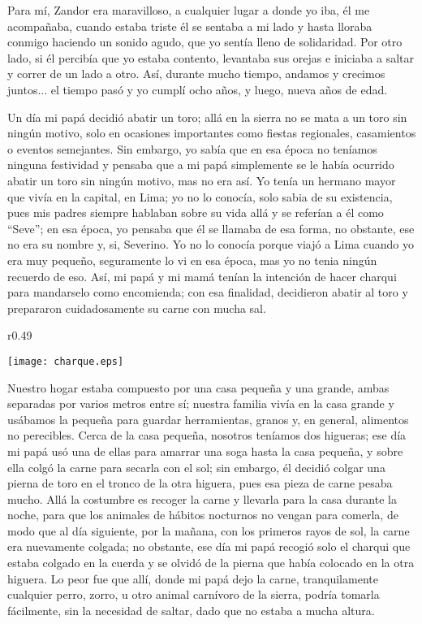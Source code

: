 Para mí, Zandor era maravilloso, a cualquier lugar a donde yo iba, él me acompañaba, cuando estaba triste él se sentaba a mi lado y hasta lloraba conmigo haciendo un sonido agudo, que yo sentía lleno de solidaridad.
Por otro lado, si él percibía que yo estaba contento, levantaba sus orejas e iniciaba a saltar y correr de un lado a otro. Así, durante mucho tiempo, andamos y crecimos juntos... el tiempo pasó y yo cumplí ocho años, y luego, nueva años de edad.

Un día mi papá decidió abatir un toro; allá en la sierra no se mata a un toro sin ningún motivo, solo en ocasiones importantes como fiestas regionales, casamientos o eventos semejantes. Sin embargo, yo sabía que en esa época no teníamos ninguna festividad y pensaba que a mi papá simplemente se le había ocurrido abatir un toro sin ningún motivo, mas no era así.
Yo tenía un hermano mayor que vivía en la capital, en Lima; yo no lo conocía, solo sabia de su existencia, pues mis padres siempre hablaban sobre su vida allá y se referían a él como ``Seve''; en esa época, yo pensaba que él se llamaba de esa forma, no obstante, ese no era su nombre y, si, Severino. Yo no lo conocía porque viajó a Lima cuando yo era muy pequeño, seguramente lo vi en esa época, mas yo no tenia ningún recuerdo de eso.
Así, mi papá y mi mamá tenían la intención de hacer charqui para mandarselo como encomienda; con esa finalidad, decidieron abatir al toro y prepararon cuidadosamente su carne con mucha sal.

\ifdefined\EnableIncludeImages
\begin{wrapfigure}{r}{0.49\textwidth}
  \begin{center}
  \vspace{-20pt}
    \texttt{[image: charque.eps]}
  \end{center}
  \vspace{-20pt}
\end{wrapfigure}
\fi
Nuestro hogar estaba compuesto por una casa pequeña y una grande, ambas separadas por varios metros entre sí; nuestra familia vivía en la casa grande y usábamos la pequeña para guardar herramientas, granos y, en general, alimentos no perecibles.
Cerca de la casa pequeña, nosotros teníamos dos higueras; ese día mi papá usó una de ellas para amarrar una soga hasta la casa pequeña, y sobre ella colgó la carne para secarla con el sol; sin embargo, él decidió colgar una pierna de toro en el tronco de la otra higuera, pues esa pieza de carne pesaba mucho.
Allá la costumbre es recoger la carne y llevarla para la casa durante la noche, para que los animales de hábitos nocturnos no vengan para comerla, de modo que al día siguiente, por la mañana, con los primeros rayos de sol, la carne era nuevamente colgada; no obstante, ese día mi papá recogió solo el charqui que estaba colgado en la cuerda y se olvidó de la pierna que había colocado en la otra higuera.
Lo peor fue que allí, donde mi papá dejo la carne, tranquilamente cualquier perro, zorro, u otro animal carnívoro de la sierra, podría tomarla fácilmente, sin la necesidad de saltar, dado que no estaba a mucha altura.

